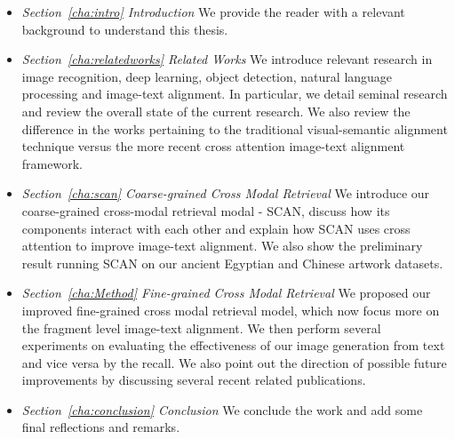 \begin{itemize}
    
    \item \textit{Section~\ref{cha:intro} Introduction}\newline
    We provide the reader with a relevant background to understand this thesis.

    \item \textit{Section~\ref{cha:relatedworks} Related Works}\newline
    We introduce relevant research in image recognition, deep learning, object detection, natural language processing and image-text alignment. In particular, we detail seminal research and review the overall state of the current research. We also review the difference in the works pertaining to the traditional visual-semantic alignment technique versus the more recent cross attention image-text alignment framework.
    
    \item \textit{Section~\ref{cha:scan} Coarse-grained Cross Modal Retrieval}\newline
    We introduce our coarse-grained cross-modal retrieval modal - SCAN, discuss how its components interact with each other and explain how SCAN uses cross attention to improve image-text alignment. We also show the preliminary result running SCAN on our ancient Egyptian and Chinese artwork datasets.
    
    \item \textit{Section~\ref{cha:Method} Fine-grained Cross Modal Retrieval}\newline
    We proposed our improved fine-grained cross modal retrieval model, which now focus more on the fragment level image-text alignment. We then perform several experiments on evaluating the effectiveness of our image generation from text and vice versa by the recall. We also point out the direction of possible future improvements by discussing several recent related publications.
    
    \item \textit{Section~\ref{cha:conclusion} Conclusion}\newline
    We conclude the work and add some final reflections and remarks.
\end{itemize}
